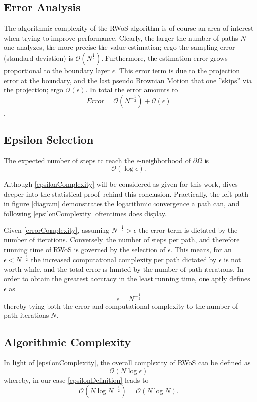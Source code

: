 \subsection{Error Analysis}
The algorithmic complexity of the \Gls{RWoS} algorithm is of course an area of interest
when trying to improve performance. Clearly, the larger the number of paths $N$ one
analyzes, the more precise the value estimation; ergo the sampling error (standard deviation)
is $\mathcal{O}(N^{\frac{1}{2}})$. Furthermore, the estimation error grows proportional to
the boundary layer $\epsilon$.
This error term is due to the projection error at the boundary, and the lost
pseudo Brownian Motion that one ''skips'' via the projection; ergo $\mathcal{O}(\epsilon)$.
In total the error amounts to $$Error = \mathcal{O}(N^{-\frac{1}{2}}) + \mathcal{O}(\epsilon)$$\cite{Bornemann}\label{errorComplexity}.

\subsection{Epsilon Selection}
\begin{theorem}
The expected number of steps to reach the $\epsilon$-neighborhood of $\partial\Omega$
is $$\mathcal{O}(\log{}\epsilon).$$\cite{Bornemann,DeLaurentis}\label{epsilonComplexity}
\end{theorem}

Although \ref{epsilonComplexity} will be considered as given for this work, \cite{DeLaurentis}
dives deeper into the statistical proof behind this conclusion.  Practically, the
 left path in figure \ref{diagram} demonstrates the logarithmic convergence a path
 can, and following \ref{epsilonComplexity} oftentimes does display.

 Given \ref{errorComplexity}, assuming $N^{-\frac{1}{2}} > \epsilon$ the error term
 is dictated by the number of iterations.  Conversely, the number of steps per path,
 and therefore running time of \Gls{RWoS} is governed by the selection of $\epsilon$.
 This means, for an $\epsilon < N^{-\frac{1}{2}}$ the increased computational complexity
 per path dictated by $\epsilon$ is not worth while, and the total error is limited
 by the number of path iterations.  In order to obtain the greatest accuracy in
 the least running time, one aptly defines $\epsilon$ as $$\epsilon = N^{-\frac{1}{2}}$$\label{epsilonDefinition}
 thereby tying both the error and computational complexity to the number of path
  iterations $N$\cite{Bornemann}.

\subsection{Algorithmic Complexity}
In light of \ref{epsilonComplexity}, the overall complexity of \Gls{RWoS} can be
defined as $$\mathcal{O}(N \log{}\epsilon)$$ whereby, in our case \ref{epsilonDefinition}
 leads to $$\mathcal{O}(N \log{N^{-\frac{1}{2}}}) = \mathcal{O}(N \log{N}).$$

